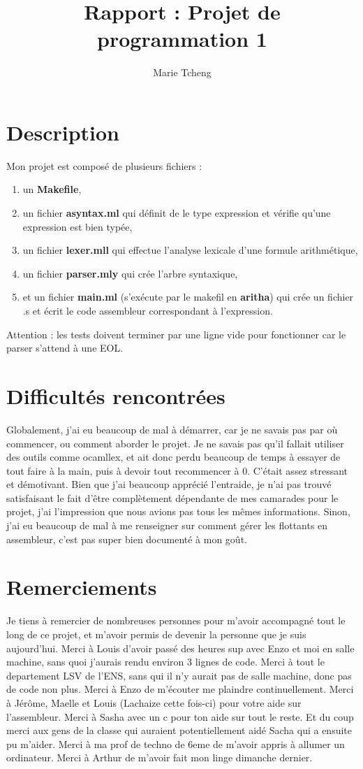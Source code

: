 \documentclass{article}
\title{Rapport : Projet de programmation 1 }
\author{Marie Tcheng }
\begin{document}
\maketitle

\section{Description}
Mon projet est composé de plusieurs fichiers : 
\begin{enumerate}
    \item un \textbf{Makefile},
    \item un fichier \textbf{asyntax.ml} qui définit de le type expression et vérifie qu'une expression est bien typée,
    \item un fichier \textbf{lexer.mll} qui effectue l'analyse lexicale d'une formule arithmétique,
    \item un fichier \textbf{parser.mly} qui crée l'arbre syntaxique,
    \item et un fichier \textbf{main.ml} (s'exécute par le makefil en \textbf{aritha}) qui crée un fichier .s et écrit le code assembleur correspondant à l'expression. 
\end{enumerate}
Attention : les tests doivent terminer par une ligne vide pour fonctionner car le parser s'attend à une EOL. 

\section{Difficultés rencontrées}
Globalement, j'ai eu beaucoup de mal à démarrer, car je ne savais pas par où commencer, ou comment aborder le projet. 
Je ne savais pas qu'il fallait utiliser des outils comme ocamllex, et ait donc perdu beaucoup de temps à essayer de tout faire à la main, puis à devoir tout recommencer à 0.
C'était assez stressant et démotivant. Bien que j'ai beaucoup apprécié l'entraide, je n'ai pas trouvé satisfaisant le fait d'être complètement dépendante de mes camarades pour le projet, j'ai l'impression que nous avions pas tous les mêmes informations. 
Sinon, j'ai eu beaucoup de mal à me renseigner sur comment gérer les flottants en assembleur, c'est pas super bien documenté à mon goût. 

\section{Remerciements}
Je tiens à remercier de nombreuses personnes pour m'avoir accompagné tout le long de ce projet, et m'avoir permis de devenir la personne que je suis aujourd'hui. 
Merci à Louis d'avoir passé des heures sup avec Enzo et moi en salle machine, sans quoi j'aurais rendu environ 3 lignes de code. 
Merci à tout le departement LSV de l'ENS, sans qui il n'y aurait pas de salle machine, donc pas de code non plus. 
Merci à Enzo de m'écouter me plaindre continuellement.
Merci à Jérôme, Maelle et Louis (Lachaize cette fois-ci) pour votre aide sur l'assembleur. Merci à Sasha avec un c pour ton aide sur tout le reste.
Et du coup merci aux gens de la classe qui auraient potentiellement aidé Sacha qui a ensuite pu m'aider.
Merci à ma prof de techno de 6eme de m'avoir appris à allumer un ordinateur.
Merci à Arthur de m'avoir fait mon linge dimanche dernier. 
\end{document}
